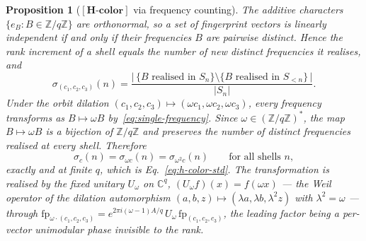 \documentclass[11pt,a4paper]{article}
\newtheorem{proposition}[theorem]{Proposition}
\theoremstyle{definition}
\theoremstyle{remark}
\newcommand{\Hcolor}{\mathbf{[H\text{-}color]}}
\newcommand{\Z}{\mathbb{Z}}
\newcommand{\C}{\mathbb{C}}
\begin{document}
      \begin{proposition}[$\Hcolor$ via frequency counting]
        \label{prop:hcolor-frequency}
        The additive characters $\{e_B : B \in \Z/q\Z\}$ are orthonormal, so a set of fingerprint
        vectors is linearly independent if and only if their frequencies $B$ are pairwise distinct.
        Hence the rank increment of a shell equals the number of new distinct frequencies it
        realises, and
        \begin{equation}
          \label{eq:sigma-frequency}
          \sigma_{(c_1,c_2,c_3)}(n)
          = \frac{\bigl|\,\{B \text{ realised in } S_n\} \setminus
            \{B \text{ realised in } S_{<n}\}\,\bigr|}{|S_n|}.
        \end{equation}
        Under the orbit dilation $(c_1, c_2, c_3) \mapsto (\omega c_1, \omega c_2, \omega c_3)$,
        every frequency transforms as $B \mapsto \omega B$ by~\eqref{eq:single-frequency}.
        Since $\omega \in (\Z/q\Z)^*$, the map $B \mapsto \omega B$ is a bijection of $\Z/q\Z$ and
        preserves the number of distinct frequencies realised at every shell.
        Therefore
        \begin{equation}
          \sigma_c(n) = \sigma_{\omega c}(n) = \sigma_{\omega^2 c}(n)
          \qquad \text{for all shells } n,
        \end{equation}
        exactly and at finite $q$, which is Eq.~\eqref{eq:h-color-std}.
        The transformation is realised by the fixed unitary $U_\omega$ on $\C^q$,
        $(U_\omega f)(x) = f(\omega x)$ --- the Weil operator of the dilation automorphism
        $(a, b, z) \mapsto (\lambda a, \lambda b, \lambda^2 z)$ with $\lambda^2 = \omega$ ---
        through
        $\mathrm{fp}_{\omega \cdot (c_1,c_2,c_3)}
        = e^{2\pi i (\omega - 1) A/q}\, U_\omega\, \mathrm{fp}_{(c_1,c_2,c_3)}$,
        the leading factor being a per-vector unimodular phase invisible to the rank.
      \end{proposition}
\end{document}
